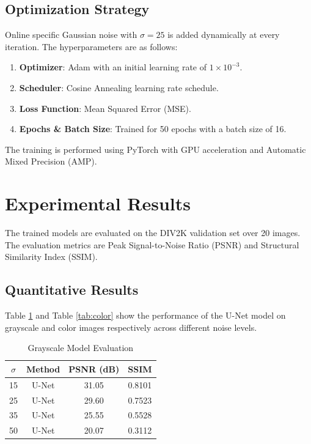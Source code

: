 \documentclass[conference]{IEEEtran}
\begin{document}
\subsection{Optimization Strategy}
Online specific Gaussian noise with $\sigma=25$ is added dynamically at every iteration. The hyperparameters are as follows:
\begin{enumerate}
    \item \textbf{Optimizer}: Adam with an initial learning rate of $1 \times 10^{-3}$.
    \item \textbf{Scheduler}: Cosine Annealing learning rate schedule.
    \item \textbf{Loss Function}: Mean Squared Error (MSE).
    \item \textbf{Epochs \& Batch Size}: Trained for 50 epochs with a batch size of 16.
\end{enumerate}
The training is performed using PyTorch with GPU acceleration and Automatic Mixed Precision (AMP).

\section{Experimental Results}
The trained models are evaluated on the DIV2K validation set over 20 images. The evaluation metrics are Peak Signal-to-Noise Ratio (PSNR) and Structural Similarity Index (SSIM).

\subsection{Quantitative Results}
Table \ref{tab:gray} and Table \ref{tab:color} show the performance of the U-Net model on grayscale and color images respectively across different noise levels.

\begin{table}[htbp]
\caption{Grayscale Model Evaluation}
\begin{center}
\begin{tabular}{cccc}
\toprule
\textbf{$\sigma$} & \textbf{Method} & \textbf{PSNR (dB)} & \textbf{SSIM} \\
\midrule
15 & U-Net & 31.05 & 0.8101 \\
25 & U-Net & 29.60 & 0.7523 \\
35 & U-Net & 25.55 & 0.5528 \\
50 & U-Net & 20.07 & 0.3112 \\
\bottomrule
\end{tabular}
\label{tab:gray}
\end{center}
\end{table}
\end{document}
